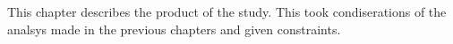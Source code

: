 This chapter describes the product of the study.
This took condiserations of the analsys made in the previous chapters and given constraints.

